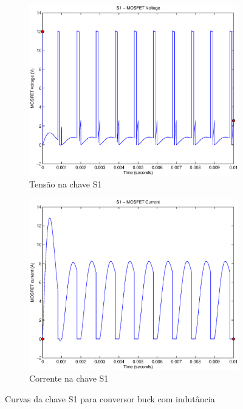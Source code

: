 \documentclass{article}
\begin{document}
\begin{figure}[H]
	\centering
	\begin{subfigure}[b]{0.4\linewidth}
		\includegraphics[width=\linewidth]{matlab/buck/r_s1v2}
		\caption{Tensão na chave S1}
	\end{subfigure}
	\begin{subfigure}[b]{0.4\linewidth}
		\centering
		\includegraphics[width=\linewidth]{matlab/buck/r_s1i2}
		\caption{Corrente na chave S1}
	\end{subfigure}
	\caption{Curvas da chave S1 para conversor buck com indutância }
	\label{fig:bs12}
\end{figure}
\end{document}

